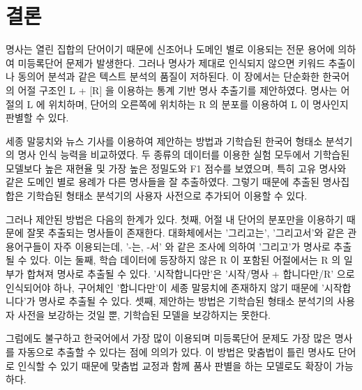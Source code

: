 \documentclass[oneside, ko,phd]{snuthesis_utf8_kor}
\begin{document}
\section{결론}
명사는 열린 집합의 단어이기 때문에 신조어나 도메인 별로 이용되는 전문 용어에 의하여 미등록단어 문제가 발생한다.
그러나 명사가 제대로 인식되지 않으면 키워드 추출이나 동의어 분석과 같은 텍스트 분석의 품질이 저하된다.
이 장에서는 단순화한 한국어의 어절 구조인 L + [R] 을 이용하는 통계 기반 명사 추출기를 제안하였다.
명사는 어절의 L 에 위치하며, 단어의 오른쪽에 위치하는 R 의 분포를 이용하여 L 이 명사인지 판별할 수 있다.

세종 말뭉치와 뉴스 기사를 이용하여 제안하는 방법과 기학습된 한국어 형태소 분석기의 명사 인식 능력을 비교하였다.
두 종류의 데이터를 이용한 실험 모두에서 기학습된 모델보다 높은 재현율 및 가장 높은 정밀도와 F1 점수를 보였으며, 특히 고유 명사와 같은 도메인 별로 용례가 다른 명사들을 잘 추출하였다. 그렇기 때문에 추출된 명사집합은 기학습된 형태소 분석기의 사용자 사전으로 추가되어 이용할 수 있다.

그러나 제안된 방법은 다음의 한계가 있다.
첫째, 어절 내 단어의 분포만을 이용하기 때문에 잘못 추출되는 명사들이 존재한다.
대화체에서는 '그리고는', '그리고서'와 같은 관용어구들이 자주 이용되는데, '-는, -서' 와 같은 조사에 의하여 '그리고'가 명사로 추출될 수 있다.
이는 
둘째, 학습 데이터에 등장하지 않은 R 이 포함된 어절에서는 R 의 일부가 합쳐져 명사로 추출될 수 있다.
'시작합니다만'은 '시작/명사 + 합니다만/R' 으로 인식되어야 하나, 구어체인 '합니다만'이 세종 말뭉치에 존재하지 않기 때문에 '시작합니다'가 명사로 추출될 수 있다.
셋째, 제안하는 방법은 기학습된 형태소 분석기의 사용자 사전을 보강하는 것일 뿐, 기학습된 모델을 보강하지는 못한다.

그럼에도 불구하고 한국어에서 가장 많이 이용되며 미등록단어 문제도 가장 많은 명사를 자동으로 추출할 수 있다는 점에 의의가 있다.
이 방법은 맞춤법이 틀린 명사도 단어로 인식할 수 있기 때문에 맞춤법 교정과 함께 품사 판별을 하는 모델로도 확장이 가능하다.

\newpage
\end{document}

